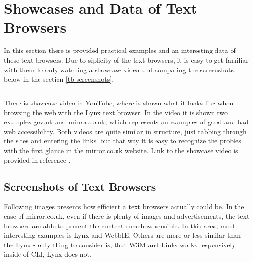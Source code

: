 \section[tb-general]{Showcases and Data of Text Browsers}
In this section there is provided practical examples and an interesting data  of these text browsers. Due to siplicity of the text browsers, it is easy to get familiar with them to only watching a showcase video and comparing the screenshots below in the section \ref*{tb-screenshots}.
\subsection[tb-showcase]{}
There is showcase video in YouTube, where is shown what it looks like when browsing the web with the Lynx text browser. In the video it is shown two examples gov.uk and mirror.co.uk, which represents an examples of good and bad web accessibility. Both videos are quite similar in structure, just tabbing through the sites and entering the links, but that way it is easy to recognize the probles with the first glance in the mirror.co.uk website. Link to the showcase video is provided in reference \textcite{tb-showcase}.
\subsection[tb-screenshots]{Screenshots of Text Browsers}
Following images presents how efficient a text browsers actually could be. In the case of mirror.co.uk, even if there is plenty of images and advertisements, the text browsers are able to present the content somehow sensible. In this area, most interesting examples is Lynx and WebbIE. Others are more or less similar than the Lynx - only thing to consider is, that W3M and Links works responsively inside of CLI, Lynx does not. 

